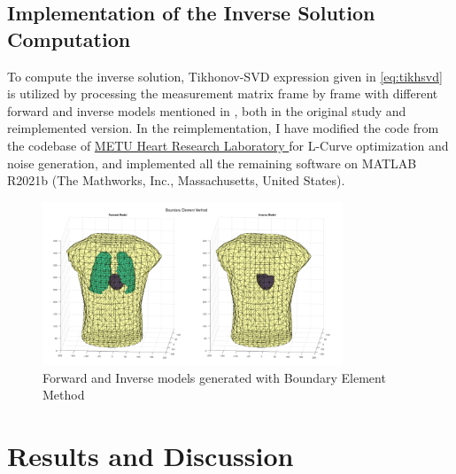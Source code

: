 \documentclass[draftcls, onecolumn, journal]{IEEEtran}
\begin{document}
\subsection{Implementation of the Inverse Solution Computation}

To compute the inverse solution, Tikhonov-SVD expression given in \eqref{eq:tikhsvd} is utilized by processing the measurement matrix frame by frame with different forward and inverse models mentioned in , both in the original study and reimplemented version. In the reimplementation, I have modified the code from the codebase of \href{http://hrl.eee.metu.edu.tr/}{METU Heart Research Laboratory \faExternalLink*} for L-Curve optimization and noise generation, and implemented all the remaining software on MATLAB R2021b (The Mathworks, Inc., Massachusetts, United States). 

\begin{figure}[h!]
\centering
\includegraphics[width=0.8\textwidth]{../images/BEM.png}
\caption{Forward and Inverse models generated with Boundary Element Method}\label{fig:mylabel}
\end{figure}

\newpage

\section{Results and Discussion}\label{sec:discussion}





\newpage
\printbibliography
\end{document}
